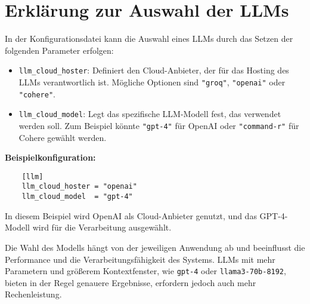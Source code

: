 \documentclass[%
	paper=a4,           %
	12pt,               %
	parskip=full,       %
	oneside,            %
	listof=totoc,		%
	bibliography=totoc,
	toc=listof,
	toc=chapterentrydotfill %
]{scrreprt}             %
\begin{document}
\section*{Erklärung zur Auswahl der LLMs}

In der Konfigurationsdatei kann die Auswahl eines LLMs durch das Setzen der folgenden Parameter erfolgen:

\begin{itemize}
    \item \texttt{llm\_cloud\_hoster}: Definiert den Cloud-Anbieter, der für das Hosting des LLMs verantwortlich ist. Mögliche Optionen sind \texttt{"groq"}, \texttt{"openai"} oder \texttt{"cohere"}.
    \item \texttt{llm\_cloud\_model}: Legt das spezifische LLM-Modell fest, das verwendet werden soll. Zum Beispiel könnte \texttt{"gpt-4"} für OpenAI oder \texttt{"command-r"} für Cohere gewählt werden.
\end{itemize}

\pagebreak

\textbf{Beispielkonfiguration:}

\begin{verbatim}
    [llm]
    llm_cloud_hoster = "openai"
    llm_cloud_model  = "gpt-4"
    \end{verbatim}

In diesem Beispiel wird OpenAI als Cloud-Anbieter genutzt, und das GPT-4-Modell wird für die Verarbeitung ausgewählt.

Die Wahl des Modells hängt von der jeweiligen Anwendung ab und beeinflusst die Performance und die Verarbeitungsfähigkeit des Systems.
LLMs mit mehr Parametern und größerem Kontextfenster, wie \texttt{gpt-4} oder \texttt{llama3-70b-8192}, bieten in der Regel genauere Ergebnisse, erfordern jedoch auch mehr Rechenleistung.
\end{document}

